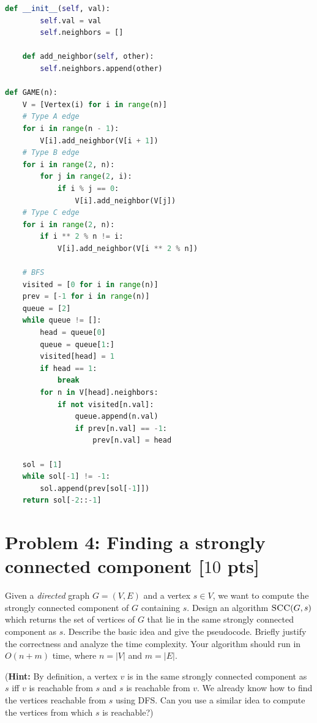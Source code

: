 \documentclass[11pt,twoside]{article}
\newcommand{\problem}[1]{\section*{Problem #1}}
\newenvironment{solution}{{\par\noindent\it Solution.}}{}
\begin{document}
\begin{solution}
\begin{lstlisting}[language=Python]
    def __init__(self, val):
        self.val = val
        self.neighbors = []

    def add_neighbor(self, other):
        self.neighbors.append(other)

def GAME(n):
    V = [Vertex(i) for i in range(n)]
    # Type A edge
    for i in range(n - 1):
        V[i].add_neighbor(V[i + 1])
    # Type B edge
    for i in range(2, n):
        for j in range(2, i):
            if i % j == 0:
                V[i].add_neighbor(V[j])
    # Type C edge
    for i in range(2, n):
        if i ** 2 % n != i:
            V[i].add_neighbor(V[i ** 2 % n])

    # BFS
    visited = [0 for i in range(n)]
    prev = [-1 for i in range(n)]
    queue = [2]
    while queue != []:
        head = queue[0]
        queue = queue[1:]
        visited[head] = 1
        if head == 1:
            break
        for n in V[head].neighbors:
            if not visited[n.val]:
                queue.append(n.val)
                if prev[n.val] == -1:
                    prev[n.val] = head 

    sol = [1]
    while sol[-1] != -1:
        sol.append(prev[sol[-1]])
    return sol[-2::-1]
\end{lstlisting}
\end{solution}

\problem{4: Finding a strongly connected component [$10$ pts]}
Given a \textit{directed} graph $G = (V,E)$ and a vertex $s \in V$, we want to compute the strongly connected component of $G$ containing $s$.
Design an algorithm $\textsc{SCC}(G,s)$ which returns the set of vertices of $G$ that lie in the same strongly connected component as $s$.
Describe the basic idea and give the pseudocode.
Briefly justify the correctness and analyze the time complexity.
Your algorithm should run in $O(n+m)$ time, where $n = |V|$ and $m = |E|$.

(\textbf{Hint:} By definition, a vertex $v$ is in the same strongly connected component as $s$ iff $v$ is reachable from $s$ and $s$ is reachable from $v$. We already know how to find the vertices reachable from $s$ using DFS. Can you use a similar idea to compute the vertices from which $s$ is reachable?)
\end{document}
